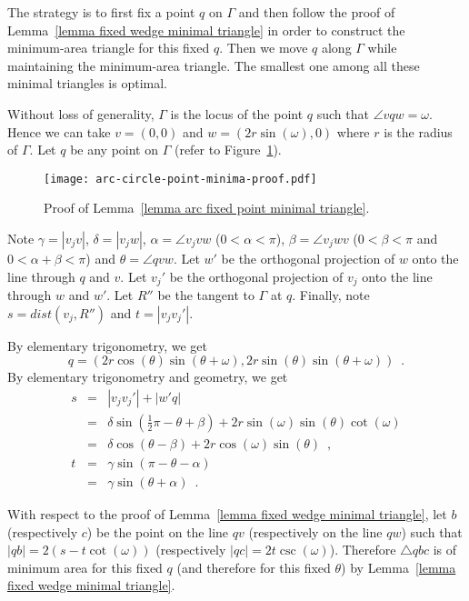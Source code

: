 \documentclass[11pt, oneside]{article}
\begin{document}
\proof
The strategy is to first fix a point $q$ on $\Gamma$
and then follow the proof of Lemma~\ref{lemma fixed wedge minimal triangle}
in order to construct the minimum-area triangle for this fixed $q$.
Then we move $q$ along $\Gamma$
while maintaining the minimum-area triangle.
The smallest one among all these minimal triangles is optimal.

Without loss of generality,
$\Gamma$ is the locus of the point $q$
such that $\angle vqw = \omega$.
Hence we can take
$v=(0,0)$ and $w=(2r\sin(\omega),0)$
where $r$ is the radius of $\Gamma$.
Let $q$ be any point on $\Gamma$
(refer to Figure~\ref{arc-circle-point-minima-proof}).
\begin{figure}
\centering
\texttt{[image: arc-circle-point-minima-proof.pdf]}
\caption{Proof of Lemma~\ref{lemma arc fixed point minimal triangle}.\label{arc-circle-point-minima-proof}}
\end{figure}
Note $\gamma = |v_jv|$,
$\delta=|v_jw|$,
$\alpha = \angle v_jvw$
($0<\alpha<\pi$),
$\beta = \angle v_jwv$
($0<\beta<\pi$ and $0<\alpha+\beta<\pi$)
and $\theta = \angle qvw$.
Let $w'$ be the orthogonal projection of $w$
onto the line through $q$ and $v$.
Let $v_j'$ be the orthogonal projection of $v_j$
onto the line through $w$ and $w'$.
Let $R''$ be the tangent to $\Gamma$ at $q$.
Finally, 
note $s=dist(v_j,R'')$ and $t=|v_jv_j'|$.

By elementary trigonometry,
we get
$$q = (2r\cos(\theta)\sin(\theta+\omega),2r\sin(\theta)\sin(\theta+\omega)) \enspace.$$
By elementary trigonometry and geometry,
we get
\begin{eqnarray*}
s &=& |v_jv_j'| + |w'q|\\
&=& \delta\sin\left(\frac{1}{2}\pi-\theta+\beta\right) + 2r\sin(\omega)\sin(\theta)\cot(\omega)\\
&=& \delta\cos(\theta-\beta) + 2r\cos(\omega)\sin(\theta) \enspace,\\
t &=& \gamma\sin(\pi-\theta-\alpha)\\
&=& \gamma\sin(\theta+\alpha) \enspace.
\end{eqnarray*}

With respect to the proof of Lemma~\ref{lemma fixed wedge minimal triangle},
let $b$ (respectively $c$)
be the point on the line $qv$
(respectively on the line $qw$)
such that $|qb| = 2(s-t\cot(\omega))$
(respectively $|qc| = 2t\csc(\omega)$).
Therefore $\triangle qbc$ 
is of minimum area for this fixed $q$
(and therefore for this fixed $\theta$)
by Lemma~\ref{lemma fixed wedge minimal triangle}.
\end{document}
